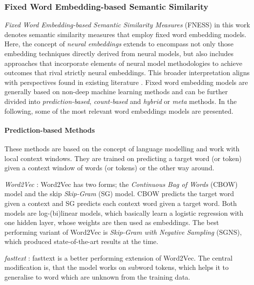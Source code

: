 \documentclass[11pt]{scrreprt}
\let\cite\parencite  %
\begin{document}
\subsubsection{Fixed Word Embedding-based Semantic Similarity}
\textit{Fixed Word Embedding-based Semantic Similarity Measures} (FNESS) in this work denotes semantic similarity measures that employ fixed word embedding models. Here, the concept of \textit{neural embeddings} extends to encompass not only those embedding techniques directly derived from neural models, but also includes approaches that  incorporate elements of neural model methodologies to achieve outcomes that rival strictly neural embeddings. This broader interpretation aligns with perspectives found in existing literature \cite{zucconIntegratingEvaluatingNeural2015, sezererSurveyNeuralWord2021}. Fixed word embedding models are generally based on non-deep machine learning methods and can be further divided into \textit{prediction-based}, \textit{count-based} and \textit{hybrid} or \textit{meta} methods. In the following, some of the most relevant word embeddings models are presented. 

\paragraph{Prediction-based Methods} 
These methods are based on the concept of language modelling and work with local context windows. They are trained on predicting a target word (or token) given a context window of words (or tokens) or the other way around.

\textit{Word2Vec} \cite{mikolovDistributedRepresentationsWords2013, mikolovLinguisticRegularitiesContinuous2013, mikolovEfficientEstimationWord2013}: Word2Vec has two forms; the \textit{Continuous Bag of Words} (CBOW) model and the skip \textit{Skip-Gram} (SG) model. CBOW predicts the target word given a context and SG predicts each context word given a target word. Both models are log-(bi)linear models, which basically learn a logistic regression with one hidden layer, whose weights are then used as embeddings. The best performing variant of Word2Vec is \textit{Skip-Gram with Negative Sampling} (SGNS), which produced state-of-the-art results at the time.

\textit{fasttext} \cite{bojanowskiEnrichingWordVectors2017}: fasttext is a better performing extension of Word2Vec. The central modification is, that the model works on subword tokens, which helps it to generalise to word which are unknown from the training data.
\end{document}
